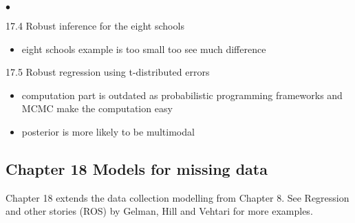 \documentclass[a4paper,11pt]{article}
\begin{document}
\begin{list}{$\bullet$}{\parsep=0pt\itemsep=2pt}
\begin{itemize}
    \end{itemize}
  \item[17.4] Robust inference for the eight schools
    \begin{itemize}
    \item eight schools example is too small too see much difference
    \end{itemize}
  \item[17.5] Robust regression using t-distributed errors
    \begin{itemize}
    \item computation part is outdated as probabilistic programming
      frameworks and MCMC make the computation easy
    \item posterior is more likely to be multimodal
    \end{itemize}
\end{list}

\subsection*{Chapter 18 Models for missing data}

Chapter 18 extends the data collection modelling from Chapter 8. See
Regression and other stories (ROS) by Gelman, Hill and Vehtari for
more examples.
\end{document}
